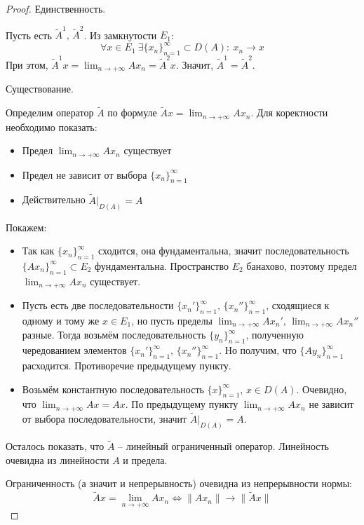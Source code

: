\documentclass[a4paper,12pt]{article}
\theoremstyle{plain}
\theoremstyle{definition}
\theoremstyle{remark}
\begin{document}
\begin{proof}
	Единственность.

	Пусть есть $\tilde{A}^1,\, \tilde{A}^2$. Из замкнутости $E_1$:
	\[
		\forall x \in E_1 \: \exists\{x_n\}_{n = 1}^\infty \subset D(A) :\: x_n \to x
	\]
	При этом, $\tilde{A}^1x = \lim_{n \to +\infty}Ax_n = \tilde{A}^2x$. Значит, $\tilde{A}^1 = \tilde{A}^2$.

	Существование.

	Определим оператор $\tilde{A}$ по формуле $\tilde{A}x = \lim_{n \to +\infty}Ax_n$. Для коректности необходимо показать:
	\begin{itemize}
		\item Предел $\lim_{n \to +\infty}Ax_n$ существует
		\item Предел не зависит от выбора $\{x_n\}_{n = 1}^\infty$
		\item Действительно $\tilde{A}|_{D(A)} = A$
	\end{itemize}

	Покажем:
	\begin{itemize}
		\item Так как $\{x_n\}_{n = 1}^\infty$ сходится, она фундаментальна, значит последовательность $\{Ax_n\}_{n = 1}^\infty \subset E_2$ фундаментальна. Пространство $E_2$ банахово, поэтому предел $\lim_{n \to +\infty}Ax_n$ существует.
		\item Пусть есть две последовательности $\{x_n'\}_{n=1}^\infty,\, \{x_n''\}_{n=1}^\infty$, сходящиеся к одному и тому же $x \in E_1$, но пусть пределы $\lim_{n \to +\infty} Ax_n',\, \lim_{n \to +\infty}Ax_n''$ разные. Тогда возьмём последовательность $\{y_n\}_{n = 1}^\infty$, полученную чередованием элементов $\{x_n'\}_{n=1}^\infty,\, \{x_n''\}_{n=1}^\infty$. Но получим, что $\{Ay_n\}_{n=1}^\infty$ расходится. Противоречие предыдущему пункту.
		\item Возьмём константную последовательность $\{x\}_{n = 1}^\infty,\, x \in D(A)$. Очевидно, что $\lim_{n \to +\infty} Ax = Ax$. По предыдущему пункту $\lim_{n \to +\infty} Ax_n$ не зависит от выбора последовательности, значит $\tilde{A}|_{D(A)} = A$.
	\end{itemize}
	Осталось показать, что $\tilde{A}$ -- линейный ограниченный оператор. Линейность очевидна из линейности $A$ и предела.

	Ограниченность (а значит и непрерывность) очевидна из непрерывности нормы:
	\[
		\tilde{A}x = \lim_{n \to +\infty}Ax_n \Leftrightarrow \|Ax_n\| \to \|\tilde{A}x\|
	\]
\end{proof}
\end{document}
